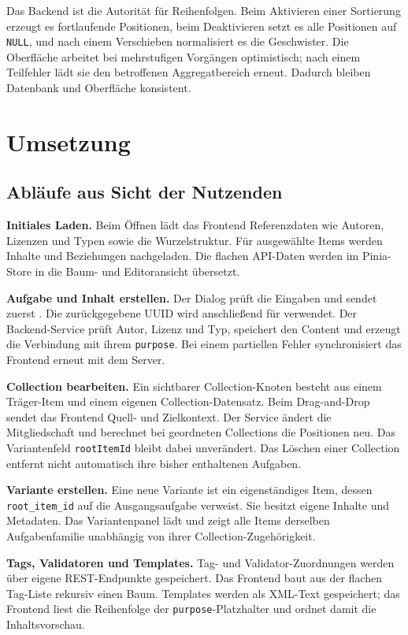 ﻿\documentclass[11pt,a4paper]{article}
\begin{document}
Das Backend ist die Autorität für Reihenfolgen. Beim Aktivieren einer
Sortierung erzeugt es fortlaufende Positionen, beim Deaktivieren setzt es alle
Positionen auf \texttt{NULL}, und nach einem Verschieben normalisiert es die
Geschwister. Die Oberfläche arbeitet bei mehrstufigen Vorgängen optimistisch;
nach einem Teilfehler lädt sie den betroffenen Aggregatbereich erneut. Dadurch
bleiben Datenbank und Oberfläche konsistent.

\section{Umsetzung}
\subsection{Abläufe aus Sicht der Nutzenden}
\textbf{Initiales Laden.} Beim Öffnen lädt das Frontend Referenzdaten wie
Autoren, Lizenzen und Typen sowie die Wurzelstruktur. Für ausgewählte Items
werden Inhalte und Beziehungen nachgeladen. Die flachen API-Daten werden im
Pinia-Store in die Baum- und Editoransicht übersetzt.

\textbf{Aufgabe und Inhalt erstellen.} Der Dialog prüft die Eingaben und sendet
zuerst . Die zurückgegebene UUID wird anschließend für
 verwendet. Der Backend-Service
prüft Autor, Lizenz und Typ, speichert den Content und erzeugt die Verbindung
mit ihrem \texttt{purpose}. Bei einem partiellen Fehler synchronisiert das
Frontend erneut mit dem Server.

\textbf{Collection bearbeiten.} Ein sichtbarer Collection-Knoten besteht aus
einem Träger-Item und einem eigenen Collection-Datensatz. Beim Drag-and-Drop
sendet das Frontend Quell- und Zielkontext. Der Service ändert die
Mitgliedschaft und berechnet bei geordneten Collections die Positionen neu.
Das Variantenfeld \texttt{rootItemId} bleibt dabei unverändert. Das Löschen
einer Collection entfernt nicht automatisch ihre bisher enthaltenen Aufgaben.

\textbf{Variante erstellen.} Eine neue Variante ist ein eigenständiges Item,
dessen \texttt{root\_item\_id} auf die Ausgangsaufgabe verweist. Sie besitzt
eigene Inhalte und Metadaten. Das Variantenpanel lädt und zeigt alle Items
derselben Aufgabenfamilie unabhängig von ihrer Collection-Zugehörigkeit.

\textbf{Tags, Validatoren und Templates.} Tag- und Validator-Zuordnungen
werden über eigene REST-Endpunkte gespeichert. Das Frontend baut aus der
flachen Tag-Liste rekursiv einen Baum. Templates werden als XML-Text
gespeichert; das Frontend liest die Reihenfolge der
\texttt{purpose}-Platzhalter und ordnet damit die Inhaltsvorschau.
\end{document}
